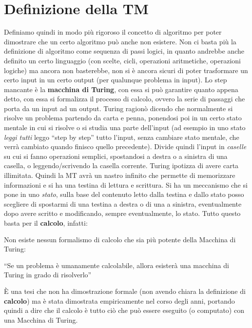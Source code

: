 \section{Definizione della TM}
Definiamo quindi in modo più rigoroso il concetto di algoritmo per poter
dimostrare che un certo algoritmo può anche non esistere. Non ci basta più la
definizione di algoritmo come sequenza di passi logici, in quanto andrebbe anche
definito un certo linguaggio (con scelte, cicli, operazioni aritmetiche,
operazioni logiche) ma ancora non basterebbe, non si è ancora sicuri di poter
trasformare un certo input in un certo output (per qualunque problema in
input). Lo step mancante è la \textbf{macchina di Turing}, con essa si può
garantire quanto appena detto, con essa si formalizza il processo di calcolo,
ovvero la serie di passaggi che porta da un input ad un output. Turing ragionò
dicendo che normalmente si risolve un problema partendo da carta e penna,
ponendosi poi in un certo stato mentale in cui si risolve o si studia una parte
dell'input (ad esempio in uno stato \textit{leggi tutti} leggo ``step by step''
tutto l'input, senza cambiare stato mentale, che verrà cambiato quando finisco
quello precedente). Divide quindi l'input in \textit{caselle} su cui si fanno
operazioni semplici, spostandosi a destra o a sinistra di una casella, o
leggendo/scrivendo la casella corrente. Turing ipotizza di avere carta
illimitata. Quindi la MT avrà un nastro infinito che permette di memorizzare
informazioni e si ha una testina di lettura e scrittura. Si ha un meccanismo che
si pone in uno \textit{stato}, sulla base del contenuto letto dalla testina e
dallo stato posso scegliere di spostarmi di una testina a destra o di una a
sinistra, eventualmente dopo avere scritto e modificando, sempre eventualmente,
lo stato. Tutto questo basta per il \textbf{calcolo}, infatti:
\begin{definizione}
  Non esiste nessun formalismo di calcolo che sia più
  potente della Macchina di Turing:
  \begin{center}
   ``Se un problema è umanamente calcolabile, allora esisterà una macchina di
    Turing in grado di risolverlo''
  \end{center}
  È una tesi che non ha dimostrazione formale (non avendo chiara la definizione
  di \textbf{calcolo}) ma è stata dimostrata
  empiricamente nel corso degli anni, portando quindi a dire che il calcolo è tutto
  ciò che può essere eseguito (o computato) con una Macchina di Turing.\\
  
\end{definizione}
